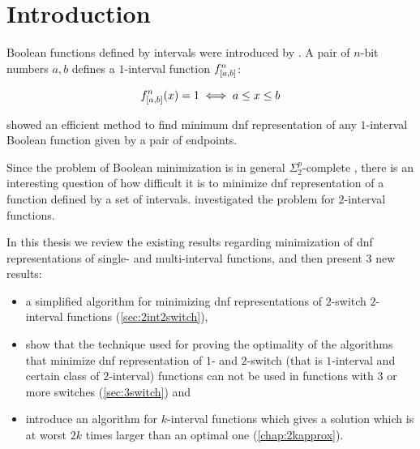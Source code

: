 \chapter*{Introduction}

Boolean functions defined by intervals were introduced
by \citet{Schieber2005154}.
A pair of $n$-bit numbers $a, b$
defines a $1$-interval function
$f^{n}_{[a, b]}$:

\[
f^{n}_{[a, b]} (x) = 1
\iff a \leq x \leq b
\]

\citeauthor{Schieber2005154} showed an efficient method
to find minimum \acrshort{dnf} representation
of any $1$-interval Boolean function
given by a pair of endpoints.

Since the problem of Boolean minimization is in general
$\Sigma_2^p$-complete \citep{Umans1998},
there is an interesting question of how difficult it is
to minimize \acrshort{dnf} representation of
a function defined by a set of intervals.
\citeauthor{Dubovsky2012} investigated the problem
for $2$-interval functions.

In this thesis we review the existing results regarding
minimization of \acrshort{dnf} representations of
single- and multi-interval functions,
and then present 3 new results:

\begin{itemize}
\item a simplified algorithm
for minimizing \acrshort{dnf} representations
of $2$-switch
$2$-interval functions (\autoref{sec:2int2switch}),
\item
show that the technique used for proving the optimality
of the algorithms that minimize
\acrshort{dnf} representation
of $1$- and $2$-switch
(that is $1$-interval and certain class of $2$-interval)
functions
can not be used in
functions with $3$ or more switches
(\autoref{sec:3switch}) and
\item
introduce an algorithm
for $k$-interval functions
which gives a solution which is at worst
$2k$ times larger than an optimal one
(\autoref{chap:2kapprox}).
\end{itemize}
